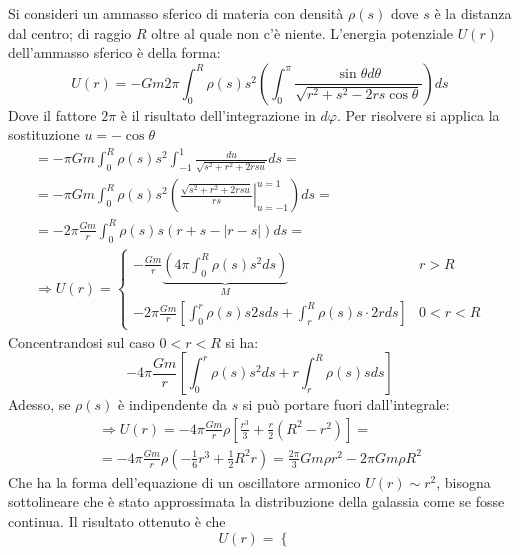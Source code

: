 \documentclass[Main.tex]{subfiles}
\begin{document}
\newpage
\begin{tema}
	Si consideri un ammasso sferico di materia con densità $\rho(s)$ dove $s$ è la distanza dal centro; di raggio $R$ oltre al quale non c'è niente.
L'energia potenziale $U(r)$ dell'ammasso sferico è della forma:
\begin{equation}
	U(r)= -Gm   2 \pi \int_{0}^{R} \rho(s) s^2 \left( \int_0^\pi \frac{\sin \theta d \theta}{ \sqrt{r^2 + s^2 - 2rs \cos \theta}} \right) ds 
\end{equation}
Dove il fattore $2 \pi$ è il risultato dell'integrazione in $d \varphi$. Per risolvere si applica la sostituzione $u= - \cos \theta$
\begin{gather*}
	= - \pi Gm \int_0^R \rho(s) s^2 \int_{-1}^1 \frac{du}{\sqrt{s^2 +r^2 +2rsu}} ds =\\
	=- \pi Gm \int_0^R \rho(s) s^2 \left( \left. \frac{\sqrt{s^2 + r^2 + 2rs u}}{rs} \right|_{u=-1}^{u=1} \right) ds=\\
=- 2 \pi \frac{Gm}{r} \int_0^R \rho (s) s \left( r+ s - |r-s| \right)ds=\\
\Rightarrow U(r)=\begin{cases}
		- \frac{Gm}{r} \underbrace{\left( 4 \pi \int_0^R \rho(s) s^2 ds \right)}_{M} \ \ &r>R\\
	- 2 \pi  \frac{Gm}{r} \left[ \int_0^r \rho(s)s 2s ds  + \int_r^R \rho(s) s \cdot 2r ds \right] &0<r<R
\end{cases}
\end{gather*}
Concentrandosi sul caso $0<r<R$ si ha:
\begin{equation}
	- 4 \pi \frac{Gm}{r} \left[ \int_0^r \rho(s) s^2 ds + r \int_r^R \rho(s) s ds \right]
\end{equation}
Adesso, se $\rho(s)$ è indipendente da $s$ si può portare fuori dall'integrale:
\begin{gather*}
	\Rightarrow U(r) = - 4 \pi \frac{Gm}{r} \rho \left[ \frac{r^3}{3} + \frac{r}{2} (R^2-r^2) \right]= \\
	= - 4 \pi \frac{Gm}{r} \rho \left( - \frac{1}{6} r^3 + \frac{1}{2} R^2r \right) = \boxed{\frac{2 \pi}{3} Gm \rho r^2 - 2 \pi Gm \rho R^2}
\end{gather*}
Che ha la forma dell'equazione di un oscillatore armonico $U(r) \sim r^2$, bisogna sottolineare che è stato approssimata la distribuzione della galassia come se fosse continua.
Il risultato ottenuto è che 
\begin{equation} \label{potenzialeammasso}
	U(r)= \begin{cases}

\end{cases}
\end{equation}
\end{tema}
\end{document}
